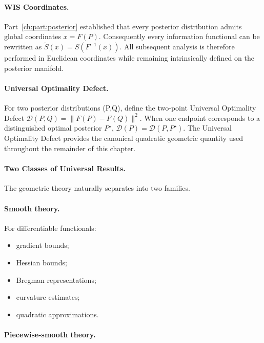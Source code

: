 \paragraph{WIS Coordinates.}



Part~\ref{ch:part:posterior} established that every posterior distribution admits global
coordinates
$x=F(P).$
Consequently every information functional can be rewritten as
$\widetilde S(x)=S(F^{-1}(x)).$
All subsequent analysis is therefore performed in Euclidean coordinates
while remaining intrinsically defined on the posterior manifold.
\paragraph{Universal Optimality Defect.}
For two posterior distributions (P,Q), define the two-point Universal
Optimality Defect
$\mathcal D(P,Q) = \|F(P)-F(Q)\|^2.$
When one endpoint corresponds to a distinguished optimal posterior
\(P^{\star}\),
$\mathcal D(P) = \mathcal D(P,P^\star).$
The Universal Optimality Defect provides the canonical quadratic
geometric quantity used throughout the remainder of this chapter.



\paragraph{Two Classes of Universal Results.}
The geometric theory naturally separates into two families.



\paragraph{Smooth theory.}



For differentiable functionals:
\begin{itemize}
\item gradient bounds;
\item Hessian bounds;
\item Bregman representations;
\item curvature estimates;
\item quadratic approximations.
\end{itemize}
\paragraph{Piecewise-smooth theory.}



